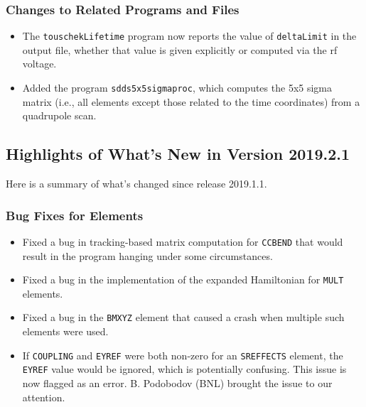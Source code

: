 \documentclass[11pt]{article}
\begin{document}
\subsubsection{Changes to Related Programs and Files}

\begin{itemize}
\item The \verb|touschekLifetime| program now reports the value of \verb|deltaLimit| in the output file, whether that
  value is given explicitly or computed via the rf voltage.
\item Added the program \verb|sdds5x5sigmaproc|, which computes the 5x5 sigma matrix (i.e., all elements except those
  related to the time coordinates) from a quadrupole scan.
\end{itemize}

\subsection{Highlights of What's New in Version 2019.2.1}

Here is a summary of what's changed since release 2019.1.1.

\subsubsection{Bug Fixes for Elements}

\begin{itemize}
\item Fixed a bug in tracking-based matrix computation for \verb|CCBEND| that would result in the program hanging under
  some circumstances.
\item Fixed a bug in the implementation of the expanded Hamiltonian for \verb|MULT| elements.
\item Fixed a bug in the \verb|BMXYZ| element that caused a crash when multiple such elements were used.
\item If \verb|COUPLING| and \verb|EYREF| were both non-zero for an \verb|SREFFECTS| element, the \verb|EYREF|
  value would be ignored, which is potentially confusing. This issue is now flagged as an error.
  B. Podobodov (BNL) brought the issue to our attention.
\end{itemize}
\end{document}
